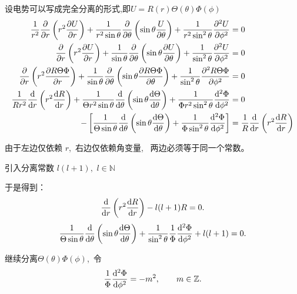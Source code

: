 设电势可以写成完全分离的形式,即$U=R(r)\Theta(\theta)\Phi(\phi)$
\begin{align*}
    \frac{1}{r^2}\frac{\partial}{\partial r}
\left(
r^2 \frac{\partial U}{\partial r}
\right)
+
\frac{1}{r^2\sin\theta}
\frac{\partial}{\partial\theta}
\left(
\sin\theta \frac{U}{\partial\theta}
\right)
+
\frac{1}{r^2\sin^2\theta}
\frac{\partial^2 U}{\partial\phi^2}&=0\\
\frac{\partial}{\partial r}
\left(
r^2 \frac{\partial U}{\partial r}
\right)
+
\frac{1}{\sin\theta}
\frac{\partial}{\partial\theta}
\left(
\sin\theta \frac{\partial U}{\partial\theta}
\right)
+
\frac{1}{\sin^2\theta}
\frac{\partial^2 U}{\partial\phi^2}&=0\\
\frac{\partial}{\partial r}
\left(
r^2 \frac{\partial R\Theta\Phi}{\partial r}
\right)
+
\frac{1}{\sin\theta}
\frac{\partial}{\partial\theta}
\left(
\sin\theta \frac{\partial R\Theta\Phi}{\partial\theta}
\right)
+
\frac{1}{\sin^2\theta}
\frac{\partial^2 R\Theta\Phi}{\partial\phi^2}&=0\\
\frac{1}{R r^2}\frac{\dif }{\dif r}
\left(
r^2 \frac{\dif R}{\dif r}
\right)
+
\frac{1}{\Theta r^2\sin\theta}
\frac{\dif }{\dif \theta}
\left(
\sin\theta \frac{\dif \Theta}{\dif \theta}
\right)
+
\frac{1}{\Phi r^2\sin^2\theta}
\frac{\dif ^2\Phi}{\dif \phi^2}
&=0\\
-
\left[
\frac{1}{\Theta\sin\theta}
\frac{\dif }{\dif \theta}
\left(
\sin\theta \frac{\dif \Theta}{\dif \theta}
\right)
+
\frac{1}{\Phi\sin^2\theta}
\frac{\dif ^2\Phi}{\dif \phi^2}
\right]
&=
\frac{1}{R}\frac{\dif }{\dif r}
\left(
r^2 \frac{\dif R}{\dif r}
\right)
\end{align*}



由于左边仅依赖 $r$, \,右边仅依赖角变量, \,
两边必须等于同一个常数。


引入分离常数 $l(l+1),\, \,l\in \mathbb N$

于是得到：
\begin{equation}
\frac{\dif }{\dif r}
\left(r^2\frac{\dif R}{\dif r}
\right)
-
{l(l+1)} R
=0.
\end{equation}
\begin{equation}
\frac{1}{\Theta\sin\theta}
\frac{\dif }{\dif \theta}
\left(
\sin\theta \frac{\dif \Theta}{\dif \theta}
\right)
+
\frac{1}{\sin^2\theta}
\frac{1}{\Phi}
\frac{\dif ^2\Phi}{\dif \phi^2}
+
l(l+1)
=0.
\end{equation}

继续分离$\Theta(\theta)\Phi(\phi)$, \,令
\[
\frac{1}{\Phi}\frac{\dif ^2\Phi}{\dif \phi^2} = -m^2,
\qquad
m \in \mathbb{Z}.
\]

